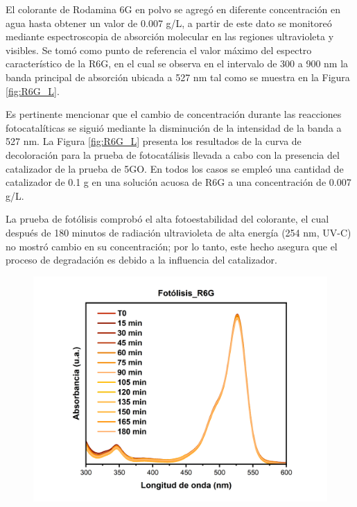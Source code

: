 \documentclass[12pt]{article}
\begin{document}
El colorante de Rodamina 6G en polvo se agregó en diferente concentración en agua hasta obtener un valor de 0.007 g/L, a partir de este dato se monitoreó mediante espectroscopia de absorción molecular en las regiones ultravioleta y visibles. Se tomó como punto de referencia el valor máximo del espectro característico de la R6G, en el cual se observa en el intervalo de 300 a 900 nm la banda principal de absorción ubicada a 527 nm tal como se muestra en la Figura \ref{fig:R6G_L}.\vspace{1em} %

Es pertinente mencionar que el cambio de concentración durante las reacciones fotocatalíticas se siguió mediante la disminución de la intensidad de la banda a 527 nm.
La Figura \ref{fig:R6G_L} presenta los resultados de la curva de decoloración para la 
prueba de fotocatálisis llevada a cabo con la presencia del catalizador de la prueba de 5GO. En todos los casos se empleó una cantidad de catalizador de 0.1 g en una solución acuosa de R6G a una concentración de 0.007 g/L. 
\vspace{1em} %

La prueba de fotólisis comprobó el alta fotoestabilidad del colorante, el cual después de 180 minutos de radiación ultravioleta de alta energía (254 nm, UV-C) no mostró cambio en su concentración; por lo tanto, este hecho asegura que el proceso de degradación es debido a la influencia del catalizador. 


\begin{figure}[H]
    	   \begin{center}
     	  	\includegraphics[width = 1\textwidth]{Imagenes/R6G/Fotocatalisis_R6G.png}
    	   \end{center} 
        \end{figure}
\end{document}

